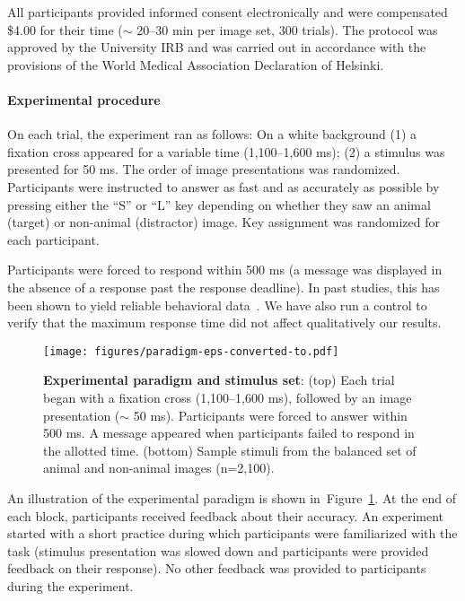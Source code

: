 \documentclass{article}
\begin{document}
All participants provided informed consent electronically and were compensated \$4.00 for their time ($\sim$ 20–30 min per image set, 300 trials). The protocol was approved by the University IRB and was carried out in accordance with the provisions of the World Medical Association Declaration of Helsinki.


\paragraph{Experimental procedure}

On each trial, the experiment ran as follows: On a white background (1) a fixation cross appeared for a variable time (1,100--1,600 ms); (2) a stimulus was presented for 50 ms. The order of image presentations was randomized. Participants were instructed to answer as fast and as accurately as possible by pressing either the “S” or “L” key depending on whether they saw an animal (target) or non-animal (distractor) image. Key assignment was randomized for each participant. 

Participants were forced to respond within 500 ms (a message was displayed in the absence of a response past the response deadline). In past studies, this has been shown to yield reliable behavioral data~\citep[e.g.][]{Sofer2015}. We have also run a control to verify that the maximum response time did not affect qualitatively our results.

\begin{figure}[t!]
  \begin{center}
    \texttt{[image: figures/paradigm-eps-converted-to.pdf]}
    \caption[Experimental paradigm]{\textbf{Experimental paradigm and stimulus set}: (top) Each trial began with a fixation cross (1,100--1,600 ms), followed by an image presentation ($\sim$ 50 ms). Participants were forced to answer within 500 ms. A message appeared when participants failed to respond in the allotted time. (bottom) Sample stimuli from the balanced set of animal and non-animal images  (n=2,100). 
    \label{fig:methods:paradigm}}
  \end{center}
\end{figure}

An illustration of the experimental paradigm is shown in~Figure~\ref{fig:methods:paradigm}. At the end of each block, participants received feedback about their accuracy. An experiment started with a short practice during which participants were familiarized with the task (stimulus presentation was slowed down and participants were provided feedback on their response). No other feedback was provided to participants during the experiment. 
\end{document}
